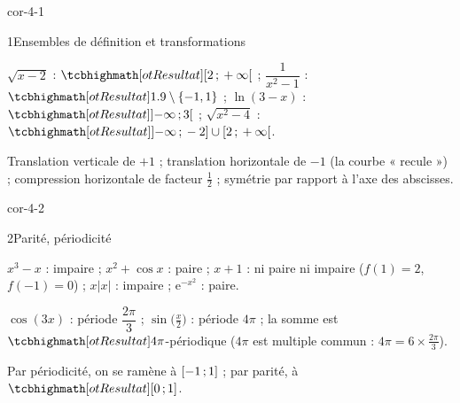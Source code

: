 
\corrigesSouples

\begin{blocLivre}{cor-4-1}
\begin{corrige}{1}{Ensembles de définition et transformations}
\begin{questions}
  \item $\sqrt{x-2}$ : $\res{\intFO{2}{+\infty}}$ ;\quad
    $\dfrac{1}{x^{2}-1}$ : $\res{\R\setminus\ens{-1,1}}$ ;\quad
    $\ln(3-x)$ : $\res{\intOO{-\infty}{3}}$ ;\quad
    $\sqrt{x^{2}-4}$ : $\res{\intOF{-\infty}{-2}\cup\intFO{2}{+\infty}}$.
  \item Translation verticale de $+1$ ; translation horizontale de $-1$
    (la courbe « recule ») ; compression horizontale de facteur $\frac12$ ;
    symétrie par rapport à l'axe des abscisses.
\end{questions}
\end{corrige}
\end{blocLivre}

\begin{blocLivre}{cor-4-2}
\begin{corrige}{2}{Parité, périodicité}
\begin{questions}
  \item $x^{3}-x$ : impaire ; $x^{2}+\cos x$ : paire ; $x+1$ : ni paire ni
    impaire ($f(1)=2$, $f(-1)=0$) ; $x|x|$ : impaire ; $\mathrm{e}^{-x^{2}}$ : paire.
  \item $\cos(3x)$ : période $\dfrac{2\pi}{3}$ ; $\sin\bigl(\frac{x}{2}\bigr)$ :
    période $4\pi$ ; la somme est $\res{4\pi}$-périodique ($4\pi$ est
    multiple commun : $4\pi=6\times\frac{2\pi}{3}$).
  \item Par périodicité, on se ramène à $\mathopen{[}-1\,{;}\,1\mathclose{]}$ ; par parité, à
    $\res{\intFF{0}{1}}$.
\end{questions}
\end{corrige}
\end{blocLivre}

